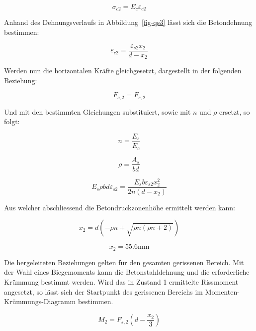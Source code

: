 \documentclass[
  12pt,
  letterpaper,
  egregdoesnotlikesansseriftitles]{scrreprt}
\begin{document}
\begin{equation}\sigma_{c 2} = E_{c} \varepsilon_{c2}\end{equation}

Anhand des Dehnungsverlaufs in Abbildung~\ref{fig-qs3} lässt sich die
Betondehnung bestimmen:

\begin{equation}\varepsilon_{c2} = \frac{\varepsilon_{s2} x_{2}}{d - x_{2}}\end{equation}

Werden nun die horizontalen Kräfte gleichgesetzt, dargestellt in der
folgenden Beziehung:

\begin{equation}F_{c,2} = F_{s,2}\end{equation}

Und mit den bestimmten Gleichungen substituiert, sowie mit \(n\) und
\(\rho\) ersetzt, so folgt:

\begin{equation}n = \frac{E_{s}}{E_{c}}\end{equation}

\begin{equation}\rho = \frac{A_{s}}{b d}\end{equation}

\begin{equation}E_{s} \rho b d \varepsilon_{s2} = \frac{E_{s} b \varepsilon_{s2} x_{2}^{2}}{2 n \left(d - x_{2}\right)}\end{equation}

Aus welcher abschliessend die Betondruckzonenhöhe ermittelt werden kann:

\begin{equation}x_{2} = d \left(- \rho n + \sqrt{\rho n \left(\rho n + 2\right)}\right)\end{equation}

\begin{equation}x_{2} = 55.6 \text{mm}\end{equation}

Die hergeleiteten Beziehungen gelten für den gesamten gerissenen
Bereich. Mit der Wahl eines Biegemoments kann die Betonstahldehnung und
die erforderliche Krümmung bestimmt werden. Wird das in Zustand 1
ermittelte Rissmoment angesetzt, so lässt sich der Startpunkt des
gerissenen Bereichs im Momenten-Krümmungs-Diagramm bestimmen.

\begin{equation}M_{2} = F_{s,2} \left(d - \frac{x_{2}}{3}\right)\end{equation}
\end{document}
